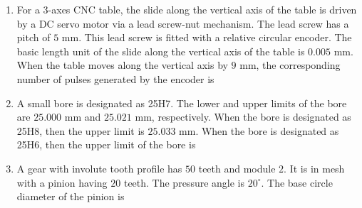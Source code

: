 \documentclass[journal,12pt,onecolumn]{IEEEtran}
\theoremstyle{remark}
\begin{document}
\begin{enumerate}
\item For a 3-axes CNC table, the slide along the vertical axis of the table is driven by a DC servo motor via a lead screw-nut mechanism. The lead screw has a pitch of $5$ mm. This lead screw is fitted with a relative  circular encoder. The basic length unit  of the slide along the vertical axis of the table is $0.005$ mm. When the table moves along the vertical axis by $9$ mm, the corresponding number of pulses generated by the encoder is
\hfill{}
\begin{enumerate}
\end{enumerate}

\item A small bore is designated as 25H7. The lower  and upper  limits of the bore are $25.000$ mm and $25.021$ mm, respectively. When the bore is designated as 25H8, then the upper  limit is $25.033$ mm. When the bore is designated as 25H6, then the upper  limit of the bore  is
\hfill{}
\begin{enumerate}
\end{enumerate}

\item A gear with involute tooth profile has $50$ teeth and module $2$. It is in mesh with a pinion having $20$ teeth. The pressure angle is $20^{\circ}$. The base circle diameter  of the pinion is
\hfill{}
\begin{enumerate}
\end{enumerate}


\end{enumerate}
\end{document}

